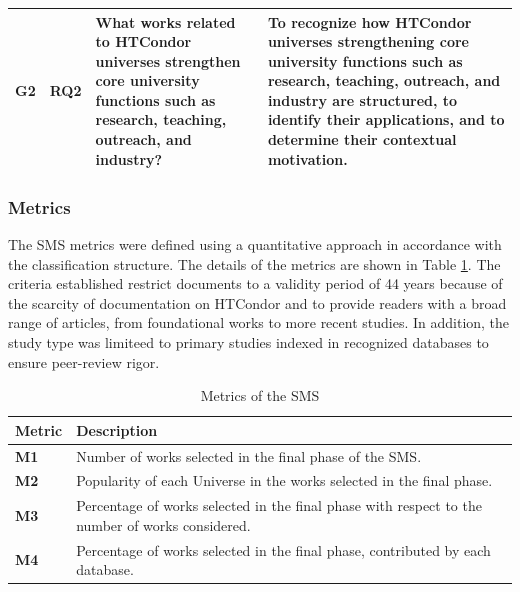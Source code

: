 \begin{table}[htbp]
\begin{tabular}{p{1cm}p{1.7cm}p{6.8cm}p{6.8cm}}
		G2                 & RQ2                        & What works related to HTCondor universes strengthen core university functions such as research, teaching, outreach, and industry?                                                                                                                                                                             & To recognize how HTCondor universes strengthening core university functions such as research, teaching, outreach, and industry are structured, to identify their applications, and to determine their contextual motivation.                                                                                                                                                    \\
		\bottomrule
	\end{tabular}
\end{table}

\subsubsection{Metrics}
The SMS metrics were defined using a quantitative approach in accordance with the classification structure. The details of the metrics are shown in Table \ref{table:Metrics}. The criteria established restrict documents to a validity period of 44 years because of the scarcity of documentation on HTCondor and to provide readers with a broad range of articles, from foundational works to more recent studies. In addition, the study type was limiteed to primary studies indexed in recognized databases to ensure peer-review rigor.

\begin{table}[htbp]
	\centering
	\caption{Metrics of the SMS}
	\label{table:Metrics}
	\renewcommand{\arraystretch}{1}  %
	\begin{tabular}{p{1cm}p{6.8cm}}
		\toprule
		\textbf{Metric} & \textbf{Description}                                                                            \\
		\midrule
		\textbf{M1}     & Number of works selected in the final phase of the SMS.                                         \\
		\addlinespace[0.8em]
		\textbf{M2}     & Popularity of each Universe in the works selected in the final phase.                           \\
		\addlinespace[0.8em]
		\textbf{M3}     & Percentage of works selected in the final phase with respect to the number of works considered. \\
		\addlinespace[0.8em]
		\textbf{M4}     & Percentage of works selected in the final phase, contributed by each database.                  \\
		\bottomrule
	\end{tabular}
\end{table}

